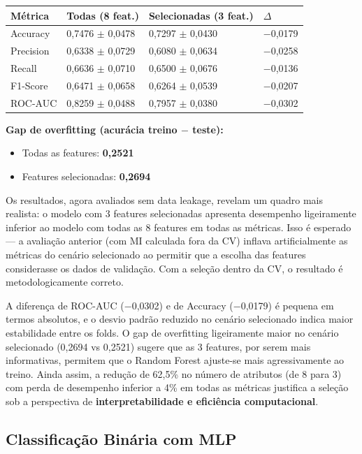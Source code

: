 \documentclass[12pt]{article}
\begin{document}
\begin{table}[ht]
\centering
\begin{tabularx}{\textwidth}{|l|X|X|X|}
\hline
Métrica & Todas (8 feat.) & Selecionadas (3 feat.) & $\Delta$ \\
\hline
Accuracy & 0,7476 $\pm$ 0,0478 & 0,7297 $\pm$ 0,0430 & $-$0,0179 \\
\hline
Precision & 0,6338 $\pm$ 0,0729 & 0,6080 $\pm$ 0,0634 & $-$0,0258 \\
\hline
Recall & 0,6636 $\pm$ 0,0710 & 0,6500 $\pm$ 0,0676 & $-$0,0136 \\
\hline
F1-Score & 0,6471 $\pm$ 0,0658 & 0,6264 $\pm$ 0,0539 & $-$0,0207 \\
\hline
ROC-AUC & 0,8259 $\pm$ 0,0488 & 0,7957 $\pm$ 0,0380 & $-$0,0302 \\
\hline
\end{tabularx}
\end{table}


\textbf{Gap de overfitting (acurácia treino $-$ teste):}
\begin{itemize}
\item Todas as features: \textbf{0,2521}
\item Features selecionadas: \textbf{0,2694}

\end{itemize}
Os resultados, agora avaliados sem data leakage, revelam um quadro mais realista: o modelo com 3 features selecionadas apresenta desempenho ligeiramente inferior ao modelo com todas as 8 features em todas as métricas. Isso é esperado --- a avaliação anterior (com MI calculada fora da CV) inflava artificialmente as métricas do cenário selecionado ao permitir que a escolha das features considerasse os dados de validação. Com a seleção dentro da CV, o resultado é metodologicamente correto.

A diferença de ROC-AUC ($-$0,0302) e de Accuracy ($-$0,0179) é pequena em termos absolutos, e o desvio padrão reduzido no cenário selecionado indica maior estabilidade entre os folds. O gap de overfitting ligeiramente maior no cenário selecionado (0,2694 vs 0,2521) sugere que as 3 features, por serem mais informativas, permitem que o Random Forest ajuste-se mais agressivamente ao treino. Ainda assim, a redução de 62,5\% no número de atributos (de 8 para 3) com perda de desempenho inferior a 4\% em todas as métricas justifica a seleção sob a perspectiva de \textbf{interpretabilidade e eficiência computacional}.

\subsection{Classificação Binária com MLP}
\end{document}

